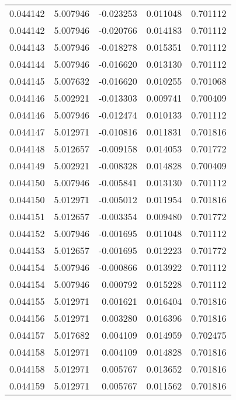 \begin{tabular}{lrrrr}
0.044142    &  5.007946 & -0.023253 &  0.011048 &             0.701112 \\
0.044142    &  5.007946 & -0.020766 &  0.014183 &             0.701112 \\
0.044143    &  5.007946 & -0.018278 &  0.015351 &             0.701112 \\
0.044144    &  5.007946 & -0.016620 &  0.013130 &             0.701112 \\
0.044145    &  5.007632 & -0.016620 &  0.010255 &             0.701068 \\
0.044146    &  5.002921 & -0.013303 &  0.009741 &             0.700409 \\
0.044146    &  5.007946 & -0.012474 &  0.010133 &             0.701112 \\
0.044147    &  5.012971 & -0.010816 &  0.011831 &             0.701816 \\
0.044148    &  5.012657 & -0.009158 &  0.014053 &             0.701772 \\
0.044149    &  5.002921 & -0.008328 &  0.014828 &             0.700409 \\
0.044150    &  5.007946 & -0.005841 &  0.013130 &             0.701112 \\
0.044150    &  5.012971 & -0.005012 &  0.011954 &             0.701816 \\
0.044151    &  5.012657 & -0.003354 &  0.009480 &             0.701772 \\
0.044152    &  5.007946 & -0.001695 &  0.011048 &             0.701112 \\
0.044153    &  5.012657 & -0.001695 &  0.012223 &             0.701772 \\
0.044154    &  5.007946 & -0.000866 &  0.013922 &             0.701112 \\
0.044154    &  5.007946 &  0.000792 &  0.015228 &             0.701112 \\
0.044155    &  5.012971 &  0.001621 &  0.016404 &             0.701816 \\
0.044156    &  5.012971 &  0.003280 &  0.016396 &             0.701816 \\
0.044157    &  5.017682 &  0.004109 &  0.014959 &             0.702475 \\
0.044158    &  5.012971 &  0.004109 &  0.014828 &             0.701816 \\
0.044158    &  5.012971 &  0.005767 &  0.013652 &             0.701816 \\
0.044159    &  5.012971 &  0.005767 &  0.011562 &             0.701816 \\

\end{tabular}

